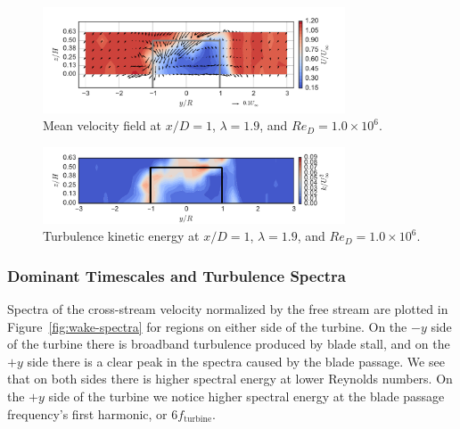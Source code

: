 \documentclass[energies,article,accept,moreauthors,pdftex,12pt,a4paper]{mdpi}
\begin{document}
\begin{figure}[ht!]
\centering
\includegraphics[width=0.8\textwidth]{figures/meancontquiv_10}
\caption{Mean velocity field at $x/D=1$, $\lambda=1.9$, and $Re_D=1.0 \times 10^6$.}
\label{fig:meancontquiv}
\end{figure}

\begin{figure}[ht!]
\centering
\includegraphics[width=0.8\textwidth]{figures/k_contours_10}
\caption{Turbulence kinetic energy at $x/D=1$, $\lambda=1.9$, and
$Re_D=1.0 \times 10^6$.}
\label{fig:kcont}
\end{figure}


\subsubsection{Dominant Timescales and Turbulence Spectra}

Spectra of the cross-stream velocity normalized by the free stream are plotted
in Figure~\ref{fig:wake-spectra} for regions on either side of the turbine. On
the $-y$ side of the turbine there is broadband turbulence produced by blade
stall, and on the $+y$ side there is a clear peak in the spectra caused by the
blade passage. We see that on both sides there is higher spectral energy at
lower Reynolds numbers. On the $+y$ side of the turbine we notice higher
spectral energy at the blade passage frequency's first harmonic, or $6
f_\mathrm{turbine}$.


\end{document}
